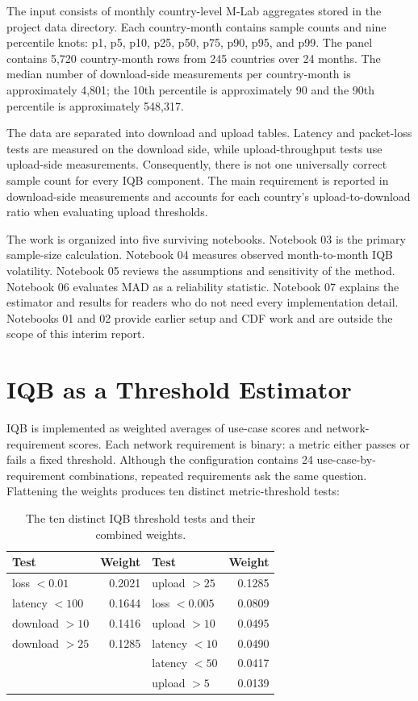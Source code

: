 \documentclass[11pt]{article}
\begin{document}
The input consists of monthly country-level M-Lab aggregates stored in the project data directory.
Each country-month contains sample counts and nine percentile knots: p1, p5, p10, p25, p50, p75,
p90, p95, and p99. The panel contains 5,720 country-month rows from 245 countries over 24 months.
The median number of download-side measurements per country-month is approximately 4,801; the
10th percentile is approximately 90 and the 90th percentile is approximately 548,317.

The data are separated into download and upload tables. Latency and packet-loss tests are measured
on the download side, while upload-throughput tests use upload-side measurements. Consequently,
there is not one universally correct sample count for every IQB component. The main requirement is
reported in download-side measurements and accounts for each country's upload-to-download ratio
when evaluating upload thresholds.

The work is organized into five surviving notebooks. Notebook 03 is the primary sample-size
calculation. Notebook 04 measures observed month-to-month IQB volatility. Notebook 05 reviews the
assumptions and sensitivity of the method. Notebook 06 evaluates MAD as a reliability statistic.
Notebook 07 explains the estimator and results for readers who do not need every implementation
detail. Notebooks 01 and 02 provide earlier setup and CDF work and are outside the scope of this
interim report.

\section{IQB as a Threshold Estimator}

IQB is implemented as weighted averages of use-case scores and network-requirement scores. Each
network requirement is binary: a metric either passes or fails a fixed threshold. Although the
configuration contains 24 use-case-by-requirement combinations, repeated requirements ask the same
question. Flattening the weights produces ten distinct metric-threshold tests:

\begin{table}[ht]
\centering
\caption{The ten distinct IQB threshold tests and their combined weights.}
\label{tab:tests}
\begin{tabular}{lrlr}
\toprule
Test & Weight & Test & Weight \\
\midrule
loss $<0.01$ & 0.2021 & upload $>25$ & 0.1285 \\
latency $<100$ & 0.1644 & loss $<0.005$ & 0.0809 \\
download $>10$ & 0.1416 & upload $>10$ & 0.0495 \\
download $>25$ & 0.1285 & latency $<10$ & 0.0490 \\
 & & latency $<50$ & 0.0417 \\
 & & upload $>5$ & 0.0139 \\
\bottomrule
\end{tabular}
\end{table}
\end{document}
